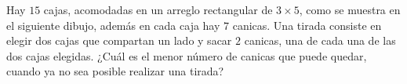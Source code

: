 Hay $15$ cajas, acomodadas en un arreglo rectangular de $3 \times  5$, como se muestra en el siguiente dibujo, además en cada caja hay $7$ canicas. Una tirada consiste en elegir dos cajas que compartan un lado y sacar $2$ canicas, una de cada una de las dos cajas elegidas. ¿Cuál es el menor número de canicas que puede quedar, cuando ya no sea posible realizar una tirada?